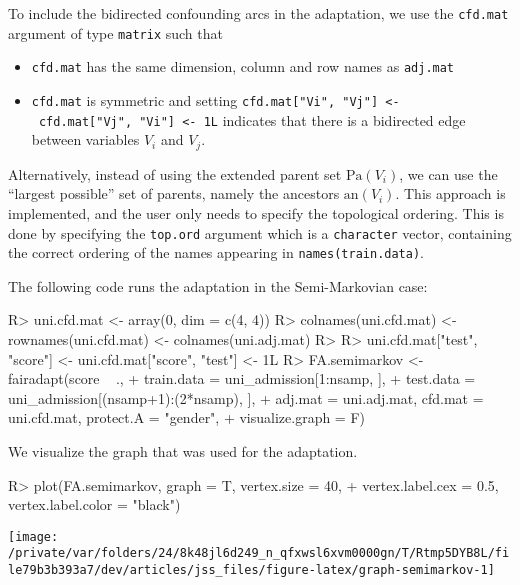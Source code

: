 \documentclass[
  notitle]{jss}
\providecommand{\tightlist}{%
  \setlength{\itemsep}{0pt}\setlength{\parskip}{0pt}}
\begin{document}
To include the bidirected confounding arcs in the adaptation, we use the
\texttt{cfd.mat} argument of type \texttt{matrix} such that

\begin{itemize}
\tightlist
\item
  \texttt{cfd.mat} has the same dimension, column and row names as
  \texttt{adj.mat}
\item
  \texttt{cfd.mat} is symmetric and setting
  \texttt{cfd.mat{[}"Vi",\ "Vj"{]}\ \textless{}-\ cfd.mat{[}"Vj",\ "Vi"{]}\ \textless{}-\ 1L}
  indicates that there is a bidirected edge between variables \(V_i\)
  and \(V_j\).
\end{itemize}

Alternatively, instead of using the extended parent set
\(\mathrm{Pa}(V_i)\), we can use the ``largest possible'' set of
parents, namely the ancestors \(\mathrm{an}(V_i)\). This approach is
implemented, and the user only needs to specify the topological
ordering. This is done by specifying the \texttt{top.ord} argument which
is a \texttt{character} vector, containing the correct ordering of the
names appearing in \texttt{names(train.data)}.

The following code runs the adaptation in the Semi-Markovian case:

\begin{CodeChunk}
\begin{CodeInput}
R> uni.cfd.mat <- array(0, dim = c(4, 4))
R> colnames(uni.cfd.mat) <- rownames(uni.cfd.mat) <- colnames(uni.adj.mat)
R> 
R> uni.cfd.mat["test", "score"] <- uni.cfd.mat["score", "test"] <- 1L
R> FA.semimarkov <- fairadapt(score ~ .,
+   train.data = uni_admission[1:nsamp, ],
+   test.data = uni_admission[(nsamp+1):(2*nsamp), ],
+   adj.mat = uni.adj.mat, cfd.mat = uni.cfd.mat, protect.A = "gender",
+   visualize.graph = F)
\end{CodeInput}
\end{CodeChunk}

We visualize the graph that was used for the adaptation.

\begin{CodeChunk}
\begin{CodeInput}
R> plot(FA.semimarkov, graph = T, vertex.size = 40,
+   vertex.label.cex = 0.5, vertex.label.color = "black")
\end{CodeInput}


\begin{center}\texttt{[image: /private/var/folders/24/8k48jl6d249\_n\_qfxwsl6xvm0000gn/T/Rtmp5DYB8L/file79b3b393a7/dev/articles/jss\_files/figure-latex/graph-semimarkov-1]} \end{center}

\end{CodeChunk}
\end{document}
